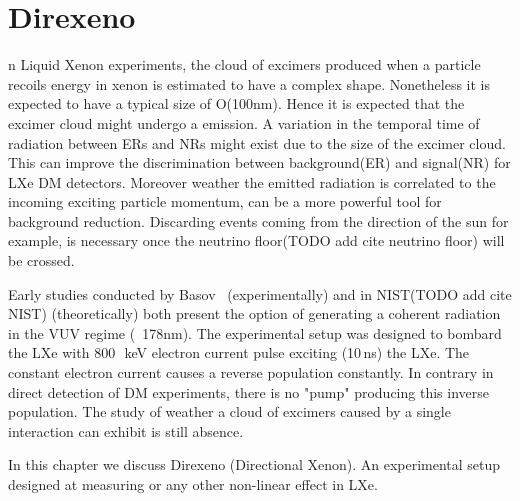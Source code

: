 %
%
\let\textcircled=\pgftextcircled
\chapter{Direxeno}
\label{chap:Direxeno}
n Liquid Xenon experiments, the cloud of excimers produced when a particle recoils energy in xenon is estimated to have a complex shape. Nonetheless it is expected to have a typical size of O(100nm). Hence it is expected that the excimer cloud might undergo a \superradiance emission. A variation in the temporal time of radiation between ERs and NRs might exist due to the size of the excimer cloud. This can improve the discrimination between background(ER) and signal(NR) for LXe DM detectors. Moreover weather the emitted radiation is correlated to the incoming exciting particle momentum, can be a more powerful tool for background reduction. Discarding events coming from the direction of the sun for example, is necessary once the neutrino floor(TODO add cite neutrino floor) will be crossed.  

Early studies conducted by Basov~\citep{BasovSRTheory} (experimentally) and in NIST(TODO add cite NIST) (theoretically) both present the option of generating a coherent radiation in the VUV regime (~178nm). The experimental setup was designed to bombard the LXe with 800~\,keV electron current pulse exciting (10\,ns) the LXe. The constant electron current causes a reverse population constantly. In contrary in direct detection of DM experiments, there is no "pump" producing this inverse population. The study of weather a cloud of excimers caused by a single interaction can exhibit \superradiance is still absence.

In this chapter we discuss Direxeno (Directional Xenon). An experimental setup designed at measuring \superradiance or any other non-linear effect in LXe.   
